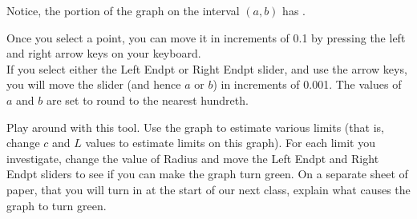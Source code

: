 \documentclass{ximera}
\begin{document}
\begin{exercise}
\begin{question}
\begin{question}
\begin{question}
\begin{question}
        		Notice, the portion of the graph on the interval $(a,b)$ has .
        		\begin{feedback}
        			Once you select a point, you can move it in increments of 0.1 by pressing the left and right arrow keys on your keyboard.\\
        			If you select either the Left Endpt or Right Endpt slider, and use the arrow keys, you will move the slider (and hence $a$ or $b$) in increments of 0.001.  The values of $a$ and $b$ are set to round to the nearest hundreth.  
        		\end{feedback}
        	\end{question}
        
        \end{question}
      \end{question}
   \end{question}
   \begin{question}
   	 Play around with this tool.  Use the graph to estimate various limits (that is, change $c$ and $L$ values to estimate limits on this graph).  For each limit you investigate, change the value of Radius and move the Left Endpt and Right Endpt sliders to see if you can make the graph turn green.  On a separate sheet of paper, that you will turn in at the start of our next class, explain what causes the graph to turn green.
   \end{question}
 \end{exercise}
\end{document}
